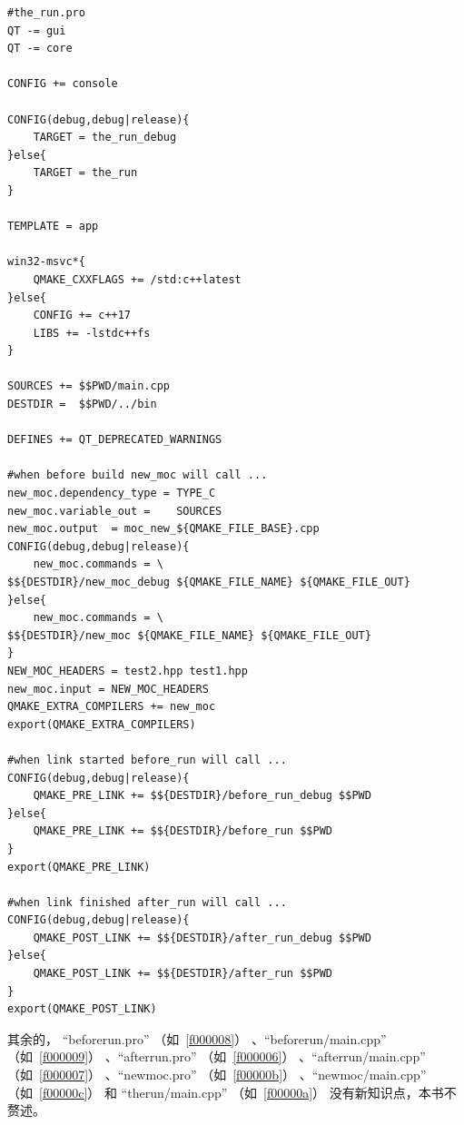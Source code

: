 \begin{lstlisting}[label=f000005,
caption=GoodLuck,
title=\lstlistingname\ \thelstlisting
]
#the_run.pro
QT -= gui
QT -= core

CONFIG += console

CONFIG(debug,debug|release){
    TARGET = the_run_debug
}else{
    TARGET = the_run
}

TEMPLATE = app

win32-msvc*{
    QMAKE_CXXFLAGS += /std:c++latest
}else{
    CONFIG += c++17
    LIBS += -lstdc++fs
}

SOURCES += $$PWD/main.cpp
DESTDIR =  $$PWD/../bin

DEFINES += QT_DEPRECATED_WARNINGS

#when before build new_moc will call ...
new_moc.dependency_type = TYPE_C
new_moc.variable_out =    SOURCES
new_moc.output  = moc_new_${QMAKE_FILE_BASE}.cpp
CONFIG(debug,debug|release){
    new_moc.commands = \
$${DESTDIR}/new_moc_debug ${QMAKE_FILE_NAME} ${QMAKE_FILE_OUT}
}else{
    new_moc.commands = \
$${DESTDIR}/new_moc ${QMAKE_FILE_NAME} ${QMAKE_FILE_OUT}
}
NEW_MOC_HEADERS = test2.hpp test1.hpp
new_moc.input = NEW_MOC_HEADERS
QMAKE_EXTRA_COMPILERS += new_moc
export(QMAKE_EXTRA_COMPILERS)

#when link started before_run will call ...
CONFIG(debug,debug|release){
    QMAKE_PRE_LINK += $${DESTDIR}/before_run_debug $$PWD
}else{
    QMAKE_PRE_LINK += $${DESTDIR}/before_run $$PWD
}
export(QMAKE_PRE_LINK)

#when link finished after_run will call ...
CONFIG(debug,debug|release){
    QMAKE_POST_LINK += $${DESTDIR}/after_run_debug $$PWD
}else{
    QMAKE_POST_LINK += $${DESTDIR}/after_run $$PWD
}
export(QMAKE_POST_LINK)
\end{lstlisting}          %



其余的，
“before\underline{\hspace{0.5em}}run.pro”
（如\lstlistingname\ \ref{f000008}）
、“before\underline{\hspace{0.5em}}run/main.cpp”
（如\lstlistingname\ \ref{f000009}）
、“after\underline{\hspace{0.5em}}run.pro”
（如\lstlistingname\ \ref{f000006}）
、“after\underline{\hspace{0.5em}}run/main.cpp”
（如\lstlistingname\ \ref{f000007}）
、“new\underline{\hspace{0.5em}}moc.pro”
（如\lstlistingname\ \ref{f00000b}）
、“new\underline{\hspace{0.5em}}moc/main.cpp”
（如\lstlistingname\ \ref{f00000c}）
和
“the\underline{\hspace{0.5em}}run/main.cpp”
（如\lstlistingname\ \ref{f00000a}）
没有新知识点，本书不赘述。

